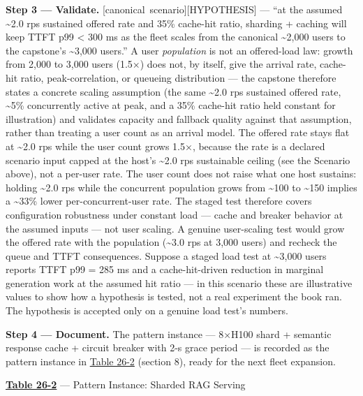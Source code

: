 \textbf{Step 3 --- Validate.} \mbox{{[}canonical scenario{]}}\hspace{0pt}\mbox{{[}HYPOTHESIS{]}}
--- ``at the assumed \textasciitilde2.0 rps sustained offered rate and
35\% cache-hit ratio, sharding + caching will keep TTFT p99 \textless{}
300 ms as the fleet scales from the canonical \textasciitilde2,000 users
to the capstone's \textasciitilde3,000 users.'' A user \emph{population}
is not an offered-load law: growth from 2,000 to 3,000 users (1.5×) does
not, by itself, give the arrival rate, cache-hit ratio,
peak-correlation, or queueing distribution --- the capstone therefore
states a concrete scaling assumption (the same \textasciitilde2.0 rps
sustained offered rate, \textasciitilde5\% concurrently active at peak,
and a 35\% cache-hit ratio held constant for illustration) and validates
capacity and fallback quality against that assumption, rather than
treating a user count as an arrival model. The offered rate stays flat
at \textasciitilde2.0 rps while the user count grows 1.5×, because the
rate is a declared scenario input capped at the host's
\textasciitilde2.0 rps sustainable ceiling (see the Scenario above), not
a per-user rate. The user count does not raise what one host sustains:
holding \textasciitilde2.0 rps while the concurrent population grows
from \textasciitilde100 to \textasciitilde150 implies a
\textasciitilde33\% lower per-concurrent-user rate. The staged test
therefore covers configuration robustness under constant load --- cache
and breaker behavior at the assumed inputs --- not user scaling. A
genuine user-scaling test would grow the offered rate with the
population (\textasciitilde3.0 rps at 3,000 users) and recheck the queue
and TTFT consequences. Suppose a staged load test at
\textasciitilde3,000 users reports TTFT p99 = 285 ms and a
cache-hit-driven reduction in marginal generation work at the assumed
hit ratio --- in this scenario these are illustrative values to show how
a hypothesis is tested, not a real experiment the book ran. The
hypothesis is accepted only on a genuine load test's numbers.

\textbf{Step 4 --- Document.} The pattern instance --- 8×H100 shard +
semantic response cache + circuit breaker with 2-s grace period --- is
recorded as the pattern instance in \hyperref[tab:26.2]{Table 26-2} (section 8), ready for
the next fleet expansion.

\textbf{\hyperref[tab:26.2]{Table 26-2}} --- Pattern Instance: Sharded RAG Serving


